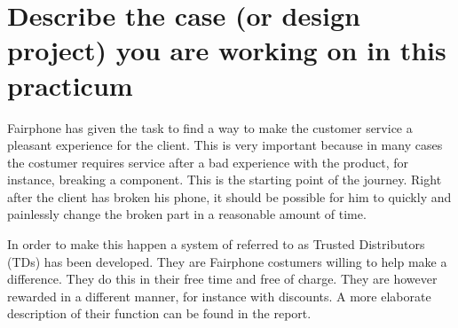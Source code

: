 \section{Describe the case (or design project) you are working on in this practicum}
Fairphone has given the task to find a way to make the customer service a pleasant experience for the client.
 This is very important because in many cases the costumer requires service after a bad experience with the product, for instance, breaking a component.
 This is the starting point of the journey.
 Right after the client has broken his phone, it should be possible for him to quickly and painlessly change the broken part in a reasonable amount of time.


In order to make this happen a system of referred to as Trusted Distributors (TDs) has been developed.
 They are Fairphone costumers willing to help make a difference.
 They do this in their free time and free of charge.
 They are however rewarded in a different manner, for instance with discounts.
 A more elaborate description of their function can be found in the report.
 